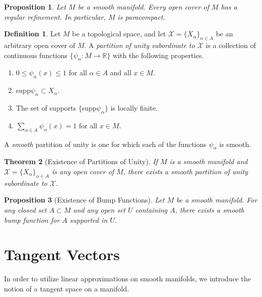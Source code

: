 \documentclass{article}
\newtheorem{theorem}{Theorem}[section]
\newtheorem{proposition}[theorem]{Proposition}
\theoremstyle{remark}
\theoremstyle{definition}
\newtheorem{definition}{Definition}[section]
\begin{document}
      \begin{proposition}
        Let $M$ be a smooth manifold. Every open cover of $M$ has a regular refinement. In particular, $M$ is paracompact. 
      \end{proposition}

      \begin{definition}
        Let $M$ be a topological space, and let $\mathcal{X} = \{X_\alpha\}_{\alpha \in A}$ be an arbitrary open cover of $M$. A \textit{partition of unity subordinate to $\mathcal{X}$} is a collection of continuous functions $\{ \psi_\alpha: M \longrightarrow \mathbb{R}\}$ with the following properties. 
        \begin{enumerate}
          \item $0 \leq \psi_\alpha (x) \leq 1$ for all $\alpha \in A$ and all $x \in M$. 
          \item supp$\psi_\alpha \subset X_\alpha$. 
          \item The set of supports $\{$supp$\psi_\alpha\}$ is locally finite. 
          \item $\sum_{\alpha \in A} \psi_\alpha (x) = 1$ for all $x \in M$. 
        \end{enumerate}
        A \textit{smooth} partition of unity is one for which each of the functions $\psi_\alpha$ is smooth. 
      \end{definition}

      \begin{theorem}[Existence of Partitions of Unity]
        If $M$ is a smooth manifold and $\mathcal{X} = \{X_\alpha\}_{\alpha \in A}$ is any open cover of $M$, there exists a smooth partition of unity subordinate to $\mathcal{X}$. 
      \end{theorem}

      \begin{proposition}[Existence of Bump Functions]
        Let $M$ be a smooth manifold. For any closed set $A \subset M$ and any open set $U$ containing $A$, there exists a smooth bump function for $A$ supported in $U$. 
      \end{proposition}

\section{Tangent Vectors}

  In order to utilize linear approximations on smooth manifolds, we introduce the notion of a tangent space on a manifold. 
\end{document}
